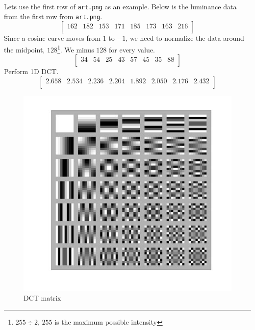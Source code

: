 \documentclass{article}
\begin{document}

Lets use the first row of \texttt{art.png} as an example.
Below is the luminance data from the first row from \texttt{art.png}.
\begin{equation*}
\begin{bmatrix}
	162 & 182 & 153 & 171 & 185 & 173 & 163 & 216 \\
\end{bmatrix}
\end{equation*}
Since a cosine curve moves from $1$ to $-1$, we need to normalize the data around the midpoint, $128$\footnote{$255\div2$, $255$ is the maximum possible intensity}.
We minus $128$ for every value.
\begin{equation*}
\begin{bmatrix}
	34 & 54 & 25 & 43 & 57 & 45 & 35 & 88 \\
\end{bmatrix}
\end{equation*}
Perform 1D DCT.
\begin{equation*}
\begin{bmatrix}
	2.658 & 2.534 & 2.236 &2.204 & 1.892 & 2.050 & 2.176 & 2.432 \\
\end{bmatrix}
\end{equation*}

\begin{figure}
\begin{center}
	\includegraphics[width=\linewidth]{./figures/dct matrix.jpg}
\end{center}
\caption{DCT matrix}
\end{figure}
\end{document}
